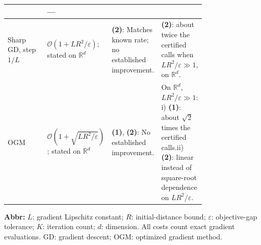 \begin{table}[tp]
\begin{threeparttable}
\begin{tabularx}{\linewidth}{@{}>{\raggedright\arraybackslash}p{0.20\linewidth}>{\raggedright\arraybackslash}p{0.32\linewidth}>{\raggedright\arraybackslash}p{0.25\linewidth}>{\raggedright\arraybackslash}X@{}}
& --- \\
\midrule
Sharp GD, step $1/L$ \citep[Thm.~3.1]{SmoothConvexDTv1}
& $\mathcal{O}\!(1+LR^2/\varepsilon)$; stated on $\mathbb{R}^d$
& \textbf{(2)}: Matches known rate; no established improvement.
& \textbf{(2)}: about twice the certified calls when $LR^2/\varepsilon\gg1$, on $\mathbb{R}^d$. \\
\midrule
OGM \citep[Cor.~4.6]{SmoothConvexASTv4}
& $\mathcal{O}\!\left(1+\sqrt{LR^2/\varepsilon}\right)$; stated on $\mathbb{R}^d$
& \textbf{(1)}, \textbf{(2)}: No established improvement.
& On $\mathbb{R}^d$, $LR^2/\varepsilon\gg1$: i) \textbf{(1)}: about $\sqrt2$ times the certified calls.\newline ii) \textbf{(2)}: linear instead of square-root dependence on $LR^2/\varepsilon$. \\
\bottomrule
\end{tabularx}
\begin{tablenotes}[flushleft]\footnotesize
\item[] \textbf{Abbr:} $L$: gradient Lipschitz constant; $R$: initial-distance bound; $\varepsilon$: objective-gap tolerance; $K$: iteration count; $d$: dimension. All costs count exact gradient evaluations. GD: gradient descent; OGM: optimized gradient method.
\end{tablenotes}
\end{threeparttable}
\end{table}
\clearpage
